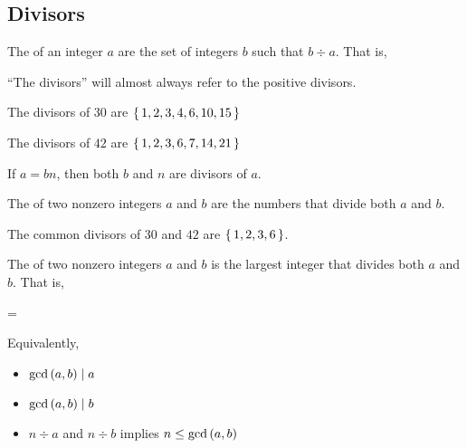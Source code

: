 \subsection{Divisors}

\begin{definition}
  The  of an integer $a$ are the set of integers $b$
  such that $b \div a$. That is,

  \begin{zz}
  \end{zz}
\end{definition}

\begin{remark}
  ``The divisors'' will almost always refer to the positive divisors.
\end{remark}

\begin{example}
  The divisors of $30$ are $\left\{ \, 1,2,3,4,6,10,15 \, \right\}$
\end{example}

\begin{example}
  The divisors of $42$ are $\left\{ \, 1,2,3,6,7,14,21 \, \right\}$
\end{example}

\begin{remark}
  If $a = bn$, then both $b$ and $n$ are divisors of $a$.
\end{remark}

\begin{definition}
  The  of two nonzero integers $a$ and $b$ are
  the numbers that divide both $a$ and $b$.
\end{definition}

\begin{example}
  The common divisors of $30$ and $42$ are $\left\{ \, 1,2,3,6 \, \right\}$.
\end{example}

\begin{definition}
  \label{def:gcd}
  The  of two nonzero integers $a$ and
  $b$ is the largest integer that divides both $a$ and $b$. That is,

  \begin{zz}
     = \max {}
  \end{zz}

  Equivalently, 

  \begin{itemize}
  \item $\gcd\left( a,b \right) \mid a$
  \item $\gcd\left( a,b \right) \mid b$
  \item $n \div a$ and $n \div b$ implies $n \le \gcd\left( a, b \right)$
  \end{itemize}
\end{definition}


